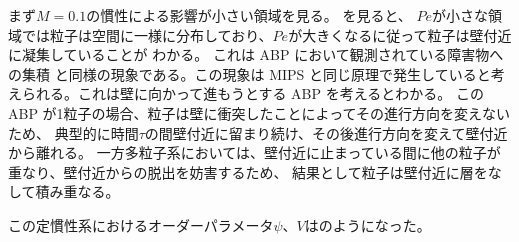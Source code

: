 \documentclass[/Users/ikedahajime/GitHub/reserch/master_report/thesis]{subfiles}
\begin{document}
まず$M=0.1$の慣性による影響が小さい領域を見る。 を見ると、
$Pe$が小さな領域では粒子は空間に一様に分布しており、$Pe$が大きくなるに従って粒子は壁付近に凝集していることが
わかる。
これは ABP において観測されている障害物への集積\cite{yangAggregationSegregationConfined2014}
と同様の現象である。この現象は MIPS\cite{filyAthermalPhaseSeparation2012}
と同じ原理で発生していると考えられる。これは壁に向かって進もうとする ABP を考えるとわかる。
この ABP が1粒子の場合、粒子は壁に衝突したことによってその進行方向を変えないため、
典型的に時間$\tau$の間壁付近に留まり続け、その後進行方向を変えて壁付近から離れる。
一方多粒子系においては、壁付近に止まっている間に他の粒子が重なり、壁付近からの脱出を妨害するため、
結果として粒子は壁付近に層をなして積み重なる。%

この定慣性系におけるオーダーパラメータ$\psi、V$はのようになった。
\end{document}

